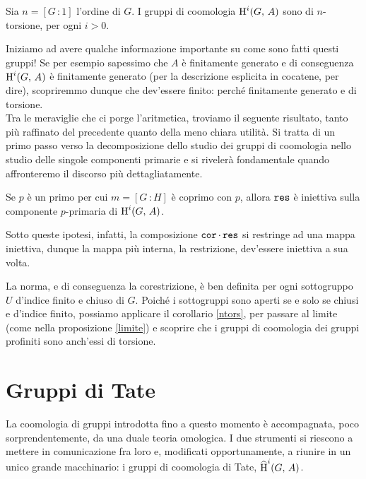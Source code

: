 \begin{corollary}\label{ntors}
	Sia $ n = [G 	\,\colon 1] $ l'ordine di $ G $. I gruppi di coomologia $ \operatorname{H}^i(G, \, A) $ sono di $ n $-torsione, per ogni $ i > 0 $.
\end{corollary}

Iniziamo ad avere qualche informazione importante su come sono fatti questi gruppi! Se per esempio sapessimo che $ A $ è finitamente generato e di conseguenza $ \operatorname{H}^i(G, \, A) $ è finitamente generato (per la descrizione esplicita in cocatene, per dire), scopriremmo dunque che dev'essere finito: perché finitamente generato e di torsione. \\

Tra le meraviglie che ci porge l'aritmetica, troviamo il seguente risultato, tanto più raffinato del precedente quanto della meno chiara utilità. Si tratta di un primo passo verso la decomposizione dello studio dei gruppi di coomologia nello studio delle singole componenti primarie e si rivelerà fondamentale quando affronteremo il discorso più dettagliatamente.

\begin{lemma}\label{injp}
	Se $ p $ è un primo per cui $ m = [G \, \colon H] $ è coprimo con $ p $, allora $ \operatorname{\mathtt{res}} $ è iniettiva sulla componente $ p $-primaria di $ \operatorname{H}^i(G, \, A) $.
\end{lemma}

Sotto queste ipotesi, infatti, la composizione $ \operatorname{\mathtt{cor}} \cdot \operatorname{\mathtt{res}} $ si restringe ad una mappa iniettiva, dunque la mappa più interna, la restrizione, dev'essere iniettiva a sua volta.

\begin{profinite}
	La norma, e di conseguenza la corestrizione, è ben definita per ogni sottogruppo $ U $ d'indice finito e chiuso di $ G $. Poiché i sottogruppi sono aperti se e solo se chiusi e d'indice finito, possiamo applicare il corollario \ref{ntors}, per passare al limite (come nella proposizione \ref{limite}) e scoprire che i gruppi di coomologia dei gruppi profiniti sono anch'essi di torsione.
\end{profinite}

\section{Gruppi di Tate}
La coomologia di gruppi introdotta fino a questo momento è accompagnata, poco sorprendentemente, da una duale teoria omologica. I due strumenti si riescono a mettere in comunicazione fra loro e, modificati opportunamente, a riunire in un unico grande macchinario: i gruppi di coomologia di Tate, $ \operatorname{\widehat{H}}^i(G, \, A) $. \\

